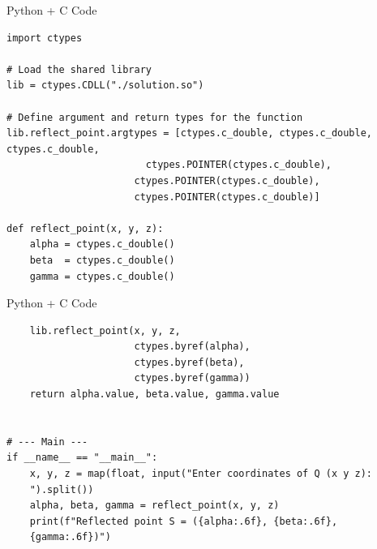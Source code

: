 \documentclass{beamer}
\begin{document}
\begin{frame}[fragile]{Python + C Code}
    \begin{verbatim}
import ctypes

# Load the shared library
lib = ctypes.CDLL("./solution.so")

# Define argument and return types for the function
lib.reflect_point.argtypes = [ctypes.c_double, ctypes.c_double,
ctypes.c_double,
                        ctypes.POINTER(ctypes.c_double),
                      ctypes.POINTER(ctypes.c_double),
                      ctypes.POINTER(ctypes.c_double)]

def reflect_point(x, y, z):
    alpha = ctypes.c_double()
    beta  = ctypes.c_double()
    gamma = ctypes.c_double()
    \end{verbatim}
\end{frame}

\begin{frame}[fragile]{Python + C Code}
    \begin{verbatim}
    lib.reflect_point(x, y, z,
                      ctypes.byref(alpha),
                      ctypes.byref(beta),
                      ctypes.byref(gamma))
    return alpha.value, beta.value, gamma.value


# --- Main ---
if __name__ == "__main__":
    x, y, z = map(float, input("Enter coordinates of Q (x y z):
    ").split())
    alpha, beta, gamma = reflect_point(x, y, z)
    print(f"Reflected point S = ({alpha:.6f}, {beta:.6f},
    {gamma:.6f})")
    \end{verbatim}
\end{frame}
\end{document}
